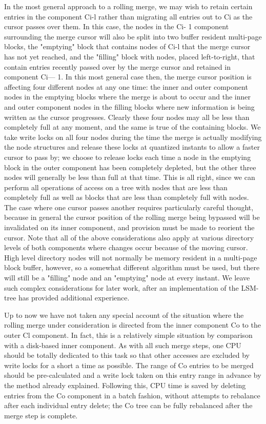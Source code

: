 \documentclass[a4paper,11pt,notitlepage,twoside,openright]{article}
\begin{document}
In the most general approach to a rolling merge, we may wish to retain
certain entries in the component Ci-l rather than migrating all entries
out to Ci as the cursor passes over them. In this case, the nodes in the
Ci- 1 component surrounding the merge cursor will also be split into two
buffer resident multi-page blocks, the "emptying" block that contains
nodes of Ci-l that the merge cursor has not yet reached, and the
"filling" block with nodes, placed left-to-right, that contain entries
recently passed over by the merge cursor and retained in component Ci---
1. In this most general case then, the merge cursor position is
affecting four different nodes at any one time: the inner and outer
component nodes in the emptying blocks where the merge is about to occur
and the inner and outer component nodes in the filling blocks where new
information is being written as the cursor progresses. Clearly these
four nodes may all be less than completely full at any moment, and the
same is true of the containing blocks. We take write locks on all four
nodes during the time the merge is actually modifying the node
structures and release these locks at quantized instants to allow a
faster cursor to pass by; we choose to release locks each time a node in
the emptying block in the outer component has been completely depleted,
but the other three nodes will generally be less than full at that time.
This is all right, since we can perform all operations of access on a
tree with nodes that are less than completely full as well as blocks
that are less than completely full with nodes. The case where one cursor
passes another requires particularly careful thought, because in general
the cursor position of the rolling merge being bypassed will be
invalidated on its inner component, and provision must be made to
reorient the cursor. Note that all of the above considerations also
apply at various directory levels of both components where changes occur
because of the moving cursor. High level directory nodes will not
normally be memory resident in a multi-page block buffer, however, so a
somewhat different algorithm must be used, but there will still be a
"filling" node and an "emptying" node at every instant. We leave such
complex considerations for later work, after an implementation of the
LSM-tree has provided additional experience.

Up to now we have not taken any special account of the situation where
the rolling merge under consideration is directed from the inner
component Co to the outer Cl component. In fact, this is a relatively
simple situation by comparison with a disk-based inner component. As
with all such merge steps, one CPU should be totally dedicated to this
task so that other accesses are excluded by write locks for a short a
time as possible. The range of Co entries to be merged should be
pre-calculated and a write lock taken on this entry range in advance by
the method already explained. Following this, CPU time is saved by
deleting entries from the Co component in a batch fashion, without
attempts to rebalance after each individual entry delete; the Co tree
can be fully rebalanced after the merge step is complete.
\end{document}
